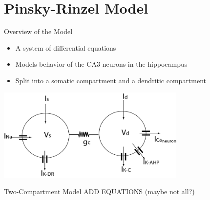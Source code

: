 \section[Pinsky-Rinzel Model]{Pinsky-Rinzel Model}

\begin{frame}[fragile]{Overview of the Model}

    \begin{itemize}
        \item A system of differential equations
        \item Models behavior of the CA3 neurons in the hippocampus
        \item Split into a somatic compartment and a dendritic compartment
    \end{itemize}
    \includegraphics[width=0.7\textwidth]{Latex/Figures/prmodel_figs/Schematic_Pinsky-Rinzel_Model.png}
\end{frame}

\begin{frame}{Two-Compartment Model}
    ADD EQUATIONS (maybe not all?)
\end{frame}

